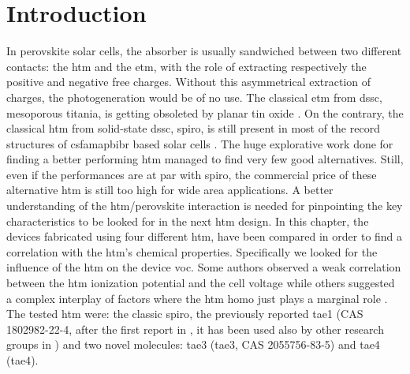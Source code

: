 


\section{Introduction}
In perovskite solar cells, the absorber is usually sandwiched between two different contacts: the \gls{htm} and the \gls{etm}, with the role of extracting respectively the positive and negative free charges.
Without this asymmetrical extraction of charges, the photogeneration would be of no use.
The classical \gls{etm} from \gls{dssc}, mesoporous titania, is getting obsoleted by planar tin oxide \cite{Jiang2018}.
On the contrary, the classical \gls{htm} from solid-state \gls{dssc}, \gls{spiro}, is still present in most of the record structures of \gls{csfamapbibr} based solar cells \cite{Saliba2016,Saliba2018}.
The huge explorative work done for finding a better performing \gls{htm} managed to find very few good alternatives.%
Still, even if the performances are at par with \gls{spiro}, the commercial price of these alternative \gls{htm} is still too high for wide area applications.
A better understanding of the \gls{htm}\-/perovskite interaction is needed for pinpointing the key characteristics to be looked for in the next \gls{htm} design.
In this chapter, the devices fabricated using four different \gls{htm}, have been compared in order to find a correlation with the \gls{htm}'s chemical properties.
Specifically we looked for the influence of the \gls{htm} on the device \gls{voc}.
Some authors observed a weak correlation between the \gls{htm} ionization potential and the cell voltage \cite{Polander2014,Abate2015a} while others suggested a complex interplay of factors where the \gls{htm} \gls{homo} just plays a marginal role \cite{Correa-Baena2017,Belisle2016,Ishida2016,Park2018,Jimenez-Lopez2017}.
The tested \gls{htm} were: the classic \gls{spiro}, the previously reported \gls{tae1} (CAS 1802982-22-4, after the first report in \cite{Cabau2015a}, it has been used also by other research groups in \cite{Choi2015b,Labban2016,Wu2016a,Wu2016b}) and two novel molecules: \glsdesc{tae3} (\gls{tae3}, CAS 2055756-83-5) and \glsdesc{tae4} (\gls{tae4}).

